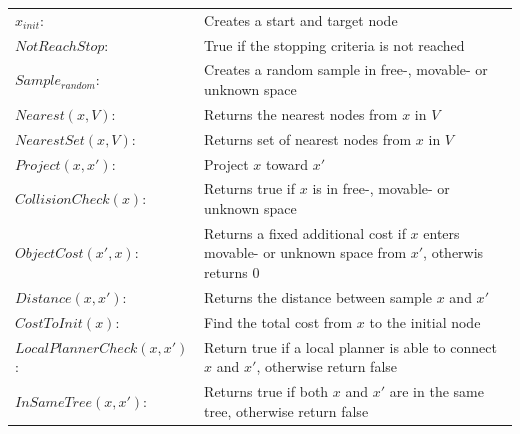 \begin{center}
\begin{tabular}[t]{l p{10cm}}
$x_{init}$:& Creates a start and target node\\ 
$NotReachStop$:& True if the stopping criteria is not reached\\ 
$Sample_{random}$:& Creates a random sample in free-, movable- or unknown space\\
$Nearest(x, V)$:& Returns the nearest nodes from $x$ in $V$\\
$NearestSet(x, V)$:& Returns set of nearest nodes from $x$ in $V$\\
$Project(x, x')$:& Project $x$ toward $x'$\\
$CollisionCheck(x)$:& Returns true if $x$ is in free-, movable- or unknown space\\
$ObjectCost(x', x)$:& Returns a fixed additional cost if $x$ enters movable- or unknown space from $x'$, otherwis returns 0\\
$Distance(x, x')$:& Returns the distance between sample $x$ and $x'$\\
$CostToInit(x)$:& Find the total cost from $x$ to the initial node\\
$LocalPlannerCheck(x, x')$:& Return true if a local planner is able to connect $x$ and $x'$, otherwise return false \\
$InSameTree(x, x')$:& Returns true if both $x$ and $x'$ are in the same tree, otherwise return false\\
\end{tabular}
\end{center}



